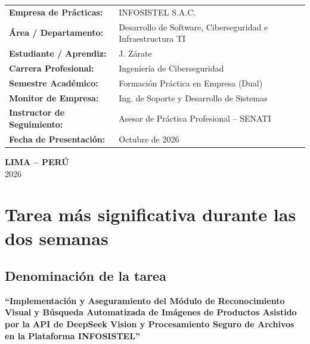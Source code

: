 \documentclass[11pt,a4paper]{article}
\begin{document}
\begin{titlepage}
    \vspace{0.8cm}

    \begin{tcolorbox}[colback=white,colframe=bordergray,arc=2mm,boxrule=1pt,left=12pt,right=12pt,top=10pt,bottom=10pt]
        \begin{tabularx}{\textwidth}{ll}
            \textbf{\color{senatiblue}Empresa de Prácticas:} & INFOSISTEL S.A.C. \\
            \textbf{\color{senatiblue}Área / Departamento:} & Desarrollo de Software, Ciberseguridad e Infraestructura TI \\
            \textbf{\color{senatiblue}Estudiante / Aprendiz:} & J. Zárate \\
            \textbf{\color{senatiblue}Carrera Profesional:} & Ingeniería de Ciberseguridad \\
            \textbf{\color{senatiblue}Semestre Académico:} & Formación Práctica en Empresa (Dual) \\
            \textbf{\color{senatiblue}Monitor de Empresa:} & Ing. de Soporte y Desarrollo de Sistemas \\
            \textbf{\color{senatiblue}Instructor de Seguimiento:} & Asesor de Práctica Profesional -- SENATI \\
            \textbf{\color{senatiblue}Fecha de Presentación:} & Octubre de 2026 \\
        \end{tabularx}
    \end{tcolorbox}

    \vfill
    {\small \color{darkgray}\textbf{LIMA -- PERÚ} \\ 2026}
\end{titlepage}

\newpage

\section{Tarea más significativa durante las dos semanas}

\subsection{Denominación de la tarea}
\textbf{``Implementación y Aseguramiento del Módulo de Reconocimiento Visual y Búsqueda Automatizada de Imágenes de Productos Asistido por la API de DeepSeek Vision y Procesamiento Seguro de Archivos en la Plataforma INFOSISTEL''}
\end{document}
